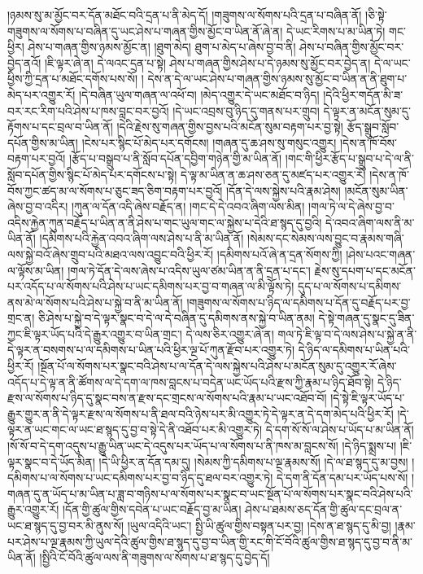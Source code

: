 །ཉམས་སུ་མ་མྱོང་བར་དོན་མཐོང་བའི་དྲན་པ་ནི་མེད་དོ། །གཟུགས་ལ་སོགས་པའི་དྲན་པ་བཞིན་ནོ། །ཅི་སྟེ་གཟུགས་ལ་སོགས་པ་བཞིན་དུ་ཡང་ཤེས་པ་གཞན་གྱིས་མྱོང་བ་ཡིན་ནོ་ཞེ་ན། དེ་ཡང་རིགས་པ་མ་ཡིན་ཏེ། གང་ཕྱིར། ཤེས་པ་གཞན་གྱིས་ཉམས་མྱོང་ན། །ཐུག་མེད། ཐུག་པ་མེད་པ་ཞེས་བྱ་བ་ནི། ཤེས་པ་བཞིན་གྱིས་མྱོང་བར་བྱེད་ནའོ། །ཇི་ལྟར་ཞེ་ན། དེ་ལའང་དྲན་པ་སྟེ། ཤེས་པ་གཞན་གྱིས་ཤེས་པ་དེ་ཉམས་སུ་མྱོང་བར་བྱེད་ན། དེ་ལ་ཡང་ཕྱིས་ཀྱི་དྲན་པ་མཐོང་དགོས་པས་སོ། །
དེས་ན་དེ་ལ་ཡང་ཤེས་པ་གཞན་གྱིས་ཉམས་སུ་མྱོང་བ་ཡིན་ན་ནི་ཐུག་པ་མེད་པར་འགྱུར་རོ། །དེ་བཞིན་ཡུལ་གཞན་ལ་འཕོ་བ། །མེད་འགྱུར་དེ་ཡང་མཐོང་བ་ཉིད། །དེའི་ཕྱིར་གདོན་མི་ཟ་བར་རང་རིག་པའི་ཤེས་པ་ཁས་བླང་བར་བྱའོ། །དེ་ཡང་འབྲས་བུ་ཉིད་དུ་གནས་པར་གྲུབ། དེ་ལྟར་ན་མངོན་སུམ་དུ་རྟོགས་པ་དང་བྲལ་བ་ཡིན་ནོ། །དེའི་རྗེས་སུ་གཞན་གྱིས་བྱས་པའི་མངོན་སུམ་བརྟག་པར་བྱ་སྟེ། རྩོད་སྒྲུབ་སློབ་དཔོན་གྱིས་མ་ཡིན། །ངེས་པར་སྙིང་པོ་མེད་པར་དགོངས། །གཞན་དུ་ཆ་ཤས་སུ་གསུང་འགྱུར། །དེས་ན་ཁོ་བོས་བརྟག་པར་བྱའོ། །རྩོད་པ་བསྒྲུབ་པ་ནི་སློབ་དཔོན་དབྱིག་གཉེན་གྱི་མ་ཡིན་ནོ། །གང་གི་ཕྱིར་རྩོད་པ་སྒྲུབ་པ་དེ་ལ་ནི་སློབ་དཔོན་གྱིས་སྙིང་པོ་མེད་པར་དགོངས་པ་སྟེ། དེ་ལྟ་མ་ཡིན་ན་ཆ་ཤས་ཅན་དུ་མཛད་པར་འགྱུར་རོ། །དེས་ན་ཁོ་བོས་ཀྱང་ཚད་མ་ལ་སོགས་པ་ཅུང་ཟད་ཅིག་བརྟག་པར་བྱའོ། །དོན་དེ་ལས་སྐྱེས་པའི་རྣམ་ཤེས། །མངོན་སུམ་ཡིན་ཞེས་བྱ་བ་འདིར། །ཀུན་ལ་དོན་འདི་ཞེས་བརྗོད་ན། །གང་དེ་དེ་འབའ་ཞིག་ལས་མིན། །གལ་ཏེ་ལ་དེ་ཞེས་བྱ་བ་འདིས་རྐྱེན་ཀུན་བརྗོད་པ་ཡིན་ན་ནི་ཤེས་པ་གང་ཡུལ་གང་ལ་སྐྱེས་པ་དེའི་ཐ་སྙད་དུ་བྱའི། དེ་འབའ་ཞིག་ལས་ནི་མ་ཡིན་ནོ། །དམིགས་པའི་རྐྱེན་འབའ་ཞིག་ལས་ཤེས་པ་ནི་མ་ཡིན་ནོ། །སེམས་དང་སེམས་ལས་བྱུང་བ་རྣམས་གཞི་ལས་སྐྱེ་བའོ་ཞེས་གྲུབ་པའི་མཐའ་ལས་འབྱུང་བའི་ཕྱིར་རོ། །དམིགས་པའོ་ཞེ་ན་དྲན་སོགས་ཀྱི། །ཤེས་པའང་གཞན་ལ་ལྟོས་མ་ཡིན། །གལ་ཏེ་དོན་དེ་ལས་ཞེས་པ་འདིས་ཡུལ་ཙམ་ཡིན་ན་ནི་དྲན་པ་དང་། རྗེས་སུ་དཔག་པ་དང་མངོན་པར་འདོད་པ་ལ་སོགས་པའི་ཤེས་པ་ཡང་དམིགས་པར་བྱ་བ་གཞན་ལ་མི་ལྟོས་ཏེ། དུད་པ་ལ་སོགས་པ་དམིགས་ནས་མེ་ལ་སོགས་པའི་ཤེས་པ་སྐྱེ་བ་ནི་མ་ཡིན་ནོ། །གཟུགས་ལ་སོགས་པ་ཉིད་ལ་དམིགས་པ་དོན་དུ་བརྗོད་པར་བྱ་གྲང་ན། ཅི་ཤེས་པ་སྐྱེ་བ་དེ་ལྟར་སྣང་བ་དེ་ལ་དེ་བཞིན་དུ་དམིགས་ནས་སྐྱེ་བ་ཡིན་ནམ། དེ་སྟེ་གཞན་དུ་སྣང་དུ་ཟིན་ཀྱང་ཇི་ལྟར་ཡོད་པའི་དེ་རྒྱུར་འགྱུར་བ་ཡིན་གྲང་། དེ་ལས་ཅིར་འགྱུར་ཞེ་ན། གལ་ཏེ་ཇི་ལྟ་བ་དེ་ལས་ཤེས་པ་སྐྱེ་ན་ནི་དེ་ལྟར་ན་བསགས་པ་ལ་དམིགས་པ་ཡིན་པའི་ཕྱིར་ལྔ་པོ་ཀུན་རྫོབ་པར་འགྱུར་ཏེ། དེ་ཉིད་ལ་དམིགས་པ་ཡིན་པའི་ཕྱིར་རོ། །སྔོན་པོ་ལ་སོགས་པར་སྣང་བའི་ཤེས་པ་ལ་དོན་དེ་ལས་སྐྱེས་པའི་ཤེས་པ་མངོན་སུམ་དུ་འགྱུར་རོ་ཞེས་འདོད་པ་དེ་ལྟ་ན་ནི་ཚོགས་ལ་དེ་དག་ལ་ཁས་བླངས་པ་བདེན་ཡང་ཡོད་པའི་རྫས་ཀྱི་རྣམ་པ་ཉིད་ཐོབ་སྟེ། དེ་ཉིད་རྫས་ལ་སོགས་པ་ཉིད་དུ་སྣང་བས་ན་རྫས་དང་གྲངས་ལ་སོགས་པའི་རྣམ་པ་ཡང་འཐོབ་བོ། །དེ་སྟེ་ཇི་ལྟར་ཡོད་པ་རྒྱུར་གྱུར་ན་ནི་དེ་ལྟར་རྫས་ལ་སོགས་པ་ནི་ཐལ་བའི་ཉེས་པར་མི་འགྱུར་ཏེ་དེ་ལྟར་ན་དེ་དག་མེད་པའི་ཕྱིར་རོ། །དེ་ལྟར་ན་ཡང་གང་ལ་ཡང་ཐ་སྙད་དུ་བྱ་བ་སྟེ་དེ་ནི་འཐོབ་པར་མི་འགྱུར་ཏེ། དེ་དག་སོ་སོ་ལ་ཤེས་པ་ཡོད་པ་མ་ཡིན་ནོ། །སོ་སོ་བ་དེ་དག་འདུས་པ་རྒྱུ་ཡིན་ཡང་དེ་འདུས་པར་ཡོད་པ་ལ་སོགས་པ་ནི་ཁས་མ་བླངས་སོ། །དེ་ཉིད་སྨྲས་པ། །ཇི་ལྟར་སྣང་བ་དེ་ཡོད་མིན། །དེ་ཡི་ཕྱིར་ན་དོན་དམ་དུ། །སེམས་ཀྱི་དམིགས་པ་ལྔ་རྣམས་སོ། །དེ་ལ་ཐ་སྙད་དུ་མ་བྱས། །དམིགས་པ་ལ་སོགས་པ་ཡང་དམིགས་པར་བྱ་བ་ཉིད་དུ་ཐལ་བར་འགྱུར་ཏེ། དེ་དག་ནི་དོན་དམ་པར་ཡོད་པས་སོ། །གཞན་དུ་ན་ཡོད་པ་མ་ཡིན་པ་ཟླ་བ་གཉིས་པ་ལ་སོགས་པར་སྣང་བ་ཡང་སྔོན་པོ་ལ་སོགས་པར་སྣང་བའི་ཤེས་པའི་རྒྱུར་འགྱུར་རོ། །དོན་གྱི་ཚུལ་གྱིས་དབེན་པ་ཡང་བརྗོད་བྱ་མ་ཡིན། ཤེས་པ་ཐམས་ཅད་དོན་གྱི་ཚུལ་དང་བྲལ་ན་ཡང་ཐ་སྙད་དུ་བྱ་བར་མི་ནུས་སོ། །ཡུལ་འདིའི་ཡང་། སྤྱི་ཡི་ཚུལ་གྱིས་བསྟན་པར་བྱ། །དེས་ན་ཐ་སྙད་དུ་མི་བྱ། །རྣམ་པར་ཤེས་པ་ལྔ་རྣམས་ཀྱི་ཡུལ་དེའི་ཚུལ་གྱིས་ཐ་སྙད་དུ་བྱ་བ་ཡིན་གྱི་རང་གི་ངོ་བོའི་ཚུལ་གྱིས་ཐ་སྙད་དུ་བྱ་བ་ནི་མ་ཡིན་ནོ། །སྤྱིའི་ངོ་བོའི་ཚུལ་ལས་ནི་གཟུགས་ལ་སོགས་པ་ཐ་སྙད་དུ་བྱེད་དོ། 